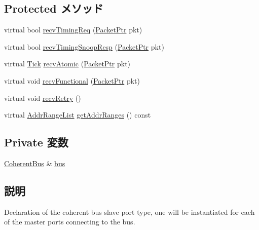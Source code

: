 \subsection*{Protected メソッド}
\begin{DoxyCompactItemize}
\item 
virtual bool \hyperlink{classCoherentBus_1_1CoherentBusSlavePort_ad3786e65574e70ec0a5bd2b0ce311d20}{recvTimingReq} (\hyperlink{classPacket}{PacketPtr} pkt)
\item 
virtual bool \hyperlink{classCoherentBus_1_1CoherentBusSlavePort_ae808ca0180bf333d9072270ed66f17fe}{recvTimingSnoopResp} (\hyperlink{classPacket}{PacketPtr} pkt)
\item 
virtual \hyperlink{base_2types_8hh_a5c8ed81b7d238c9083e1037ba6d61643}{Tick} \hyperlink{classCoherentBus_1_1CoherentBusSlavePort_a9b5348b3521da3a6333e6b0eed3b98e6}{recvAtomic} (\hyperlink{classPacket}{PacketPtr} pkt)
\item 
virtual void \hyperlink{classCoherentBus_1_1CoherentBusSlavePort_a914924599c231593833dd1d527b4bb7c}{recvFunctional} (\hyperlink{classPacket}{PacketPtr} pkt)
\item 
virtual void \hyperlink{classCoherentBus_1_1CoherentBusSlavePort_a7ec461ad187b82b4b21e27c86e45cf9c}{recvRetry} ()
\item 
virtual \hyperlink{classstd_1_1list}{AddrRangeList} \hyperlink{classCoherentBus_1_1CoherentBusSlavePort_a9367d737cb872cb8573f44b501f99363}{getAddrRanges} () const 
\end{DoxyCompactItemize}
\subsection*{Private 変数}
\begin{DoxyCompactItemize}
\item 
\hyperlink{classCoherentBus}{CoherentBus} \& \hyperlink{classCoherentBus_1_1CoherentBusSlavePort_a3fedef8f1565149424b7e0e4772fe8c9}{bus}
\end{DoxyCompactItemize}


\subsection{説明}
Declaration of the coherent bus slave port type, one will be instantiated for each of the master ports connecting to the bus. 

